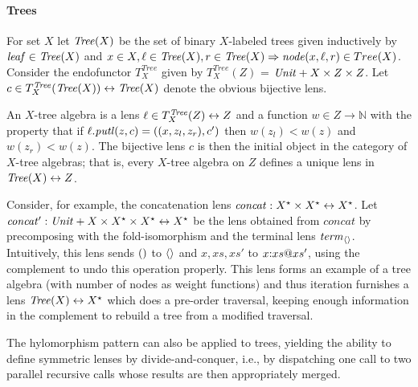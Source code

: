 \begin{defn}[$R$-similarity]
\begin{theorem}
\begin{lemma}
\begin{theorem}[No products]
\begin{lemma}
\begin{defn}
\begin{theorem}
\begin{theorem}
\begin{corollary}[Hylomorphism]
\paragraph{Trees}
For set $X$ let $\mathit{Tree}(X)$ be the set of binary $X$-labeled trees given
inductively by $\mathit{leaf} \in \mathit{Tree}(X)$ and $x \in X, \ell \in \mathit{Tree}(X), r \in \mathit{Tree}(X) \Rightarrow \mathit{node}(x,\ell,r) \in Tree(X)$.
Consider the endofunctor \iffull $T^{Tree}_X$ given by \fi $T^{Tree}_X(Z)$ =
$\mathit{Unit} + X \times Z \times Z$. Let $c \in T^{\mathit{Tree}}_X(\mathit{Tree}(X)) \leftrightarrow
\mathit{Tree}(X)$ denote the obvious bijective lens.  

An $X$-tree algebra is a lens $\ell \in T^{\mathit{Tree}}_X(Z)\leftrightarrow Z$
and a function $w \in Z\rightarrow \mathbb{N}$ 
 with the property that if 
$\ell.\mathit{putl}(z,c) = ((x,z_l,z_r),c')$
 then $w(z_l) < w(z)$ and $w(z_r) < w(z)$. 
%
The bijective lens $c$ is then the initial object in the category of
$X$-tree algebras; that is, every $X$-tree algebra on $Z$ defines a unique
lens in $\mathit{Tree}(X)\leftrightarrow Z$.

Consider, for example, the concatenation lens
$\mathit{concat}:X^\star \times X^\star\leftrightarrow X^\star$. Let\label{concatprime}
$\mathit{concat'}:\mathit{Unit} + X \times X^\star \times X^\star \leftrightarrow
X^\star$ be the lens obtained from $\mathit{concat}$ by precomposing
with the fold-isomorphism and the terminal lens $\mathit{term}_{\left<\right>}$.
Intuitively, this lens sends ${()}$ to $\left<\right>$ and $x,xs,xs'$ to
$x \mathord{:} xs @ xs'$, using the complement to undo this operation
properly. This lens forms an example of a tree algebra (with number of
nodes as weight functions) and thus iteration furnishes a lens
$\mathit{Tree}(X)\leftrightarrow X^\star$ which does a pre-order traversal, keeping enough
information in the complement to rebuild a tree from a modified traversal.

The hylomorphism pattern can also be applied to trees,
yielding the ability to define symmetric lenses by
divide-and-conquer, i.e., by dispatching one call to two parallel
recursive calls whose results are then appropriately merged.





\end{corollary}
\end{theorem}
\end{theorem}
\end{defn}
\end{lemma}
\end{theorem}
\end{lemma}
\end{theorem}
\end{defn}
